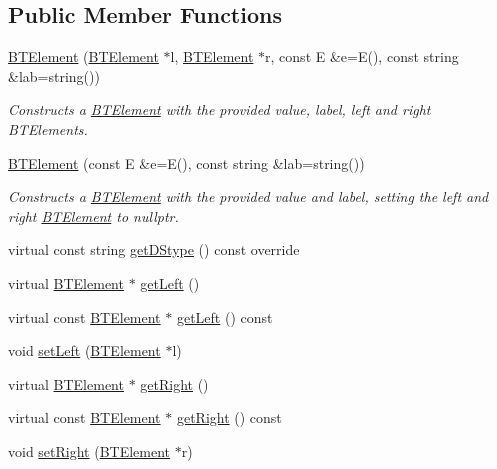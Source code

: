 \subsection*{Public Member Functions}
\begin{DoxyCompactItemize}
\item 
\hyperlink{classbridges_1_1datastructure_1_1_b_t_element_a7d93a35b1f2553cfd92a289a363caa5a}{B\+T\+Element} (\hyperlink{classbridges_1_1datastructure_1_1_b_t_element}{B\+T\+Element} $\ast$l, \hyperlink{classbridges_1_1datastructure_1_1_b_t_element}{B\+T\+Element} $\ast$r, const E \&e=E(), const string \&lab=string())
\begin{DoxyCompactList}\small\item\em Constructs a \hyperlink{classbridges_1_1datastructure_1_1_b_t_element}{B\+T\+Element} with the provided value, label, left and right B\+T\+Elements. \end{DoxyCompactList}\item 
\hyperlink{classbridges_1_1datastructure_1_1_b_t_element_a1bea31e483a1bf737e5da5cc9178bc3d}{B\+T\+Element} (const E \&e=E(), const string \&lab=string())
\begin{DoxyCompactList}\small\item\em Constructs a \hyperlink{classbridges_1_1datastructure_1_1_b_t_element}{B\+T\+Element} with the provided value and label, setting the left and right \hyperlink{classbridges_1_1datastructure_1_1_b_t_element}{B\+T\+Element} to nullptr. \end{DoxyCompactList}\item 
virtual const string \hyperlink{classbridges_1_1datastructure_1_1_b_t_element_a2118b6b74f3fe0fec39e3b258a7dee89}{get\+D\+Stype} () const override
\item 
virtual \hyperlink{classbridges_1_1datastructure_1_1_b_t_element}{B\+T\+Element} $\ast$ \hyperlink{classbridges_1_1datastructure_1_1_b_t_element_aaa551a4f24bb7ed63fd39e9c4153402b}{get\+Left} ()
\item 
virtual const \hyperlink{classbridges_1_1datastructure_1_1_b_t_element}{B\+T\+Element} $\ast$ \hyperlink{classbridges_1_1datastructure_1_1_b_t_element_aa13df422de48c6297223c3c28caf9277}{get\+Left} () const
\item 
void \hyperlink{classbridges_1_1datastructure_1_1_b_t_element_a6baeb1237f1879eb6a04fc144a7b55d6}{set\+Left} (\hyperlink{classbridges_1_1datastructure_1_1_b_t_element}{B\+T\+Element} $\ast$l)
\item 
virtual \hyperlink{classbridges_1_1datastructure_1_1_b_t_element}{B\+T\+Element} $\ast$ \hyperlink{classbridges_1_1datastructure_1_1_b_t_element_a3f73fcc5a7ed1af1a628803879682f80}{get\+Right} ()
\item 
virtual const \hyperlink{classbridges_1_1datastructure_1_1_b_t_element}{B\+T\+Element} $\ast$ \hyperlink{classbridges_1_1datastructure_1_1_b_t_element_afc0f4e1454bbdfb6a61ae9acf606e22a}{get\+Right} () const
\item 
void \hyperlink{classbridges_1_1datastructure_1_1_b_t_element_a016dfb73d148418ba581cfec96375db3}{set\+Right} (\hyperlink{classbridges_1_1datastructure_1_1_b_t_element}{B\+T\+Element} $\ast$r)
\end{DoxyCompactItemize}
